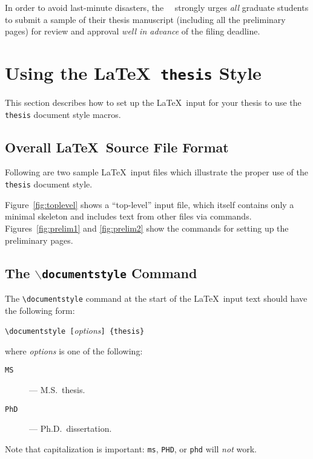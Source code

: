 In order to avoid last-minute disasters,
the \ucla\ \tdadvisor\ strongly urges {\em all\/} graduate students
to submit a sample of their thesis manuscript
(including all the preliminary pages)
for review and approval {\em well in advance\/} of the filing deadline.

\section {Using the \LaTeX\ {\tt thesis} Style}

This section describes how to set up
the \LaTeX\ input for your thesis
to use the \verb+thesis+ document style macros.

\subsection {Overall \LaTeX\ Source File Format}

Following are two sample \LaTeX\ input files
which illustrate the proper use of the \verb+thesis+
document style.

Figure~\ref{fig:toplevel}
shows a ``top-level'' input file,
which itself contains only a minimal skeleton
and includes text from other files
via \verb++ commands.
Figures~\ref{fig:prelim1} and \ref{fig:prelim2}
show the commands for setting up the preliminary pages.

\subsection {The $\backslash${\tt documentstyle} Command}

The \verb+\documentstyle+ command at the start of the \LaTeX\ input text
should have the following form:

\begin {center}
\verb+\documentstyle [+{\sl options\/}\verb+] {thesis}+
\end {center}

where {\sl options} is one of the following:

\begin {description}

\item [{\tt MS}]
--- M.S.\ thesis.

\item [{\tt PhD}]
--- Ph.D.\ dissertation.

\end {description}

Note that capitalization is important:
\verb+ms+, \verb+PHD+, or \verb+phd+ will {\em not\/} work.

